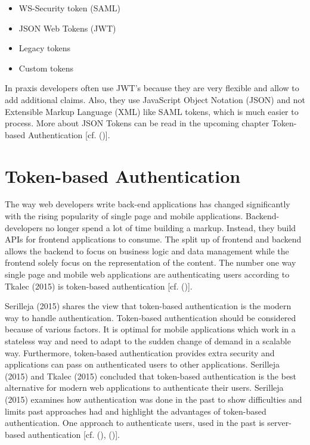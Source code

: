 \begin{itemize}
	\item WS-Security token (SAML)
	\item JSON Web Tokens (JWT)
	\item Legacy tokens
	\item Custom tokens
\end{itemize}

In praxis developers often use JWT's because they are very flexible and allow to add additional claims. Also, they use JavaScript Object Notation (JSON) and not Extensible Markup Language (XML) like SAML tokens, which is much easier to process. More about JSON Tokens can be read in the upcoming chapter Token-based Authentication [cf. (\cite{Spencer:2018:APISecurity})].

\section{Token-based Authentication}
\label{tokenBasedAuthentication}

The way web developers write back-end applications has changed significantly with the rising popularity of single page and mobile applications. Backend-developers no longer spend a lot of time building a markup. Instead, they build APIs for frontend applications to consume. The split up of frontend and backend allows the backend to focus on business logic and data management while the frontend solely focus on the representation of the content. The number one way single page and mobile web applications are authenticating users according to Tkalec (2015) is token-based authentication [cf. (\cite{Tkalec:2015})].  

Serilleja (2015) shares the view that token-based authentication is the modern way to handle authentication. Token-based authentication should be considered because of various factors. It is optimal for mobile applications which work in a stateless way and need to adapt to the sudden change of demand in a scalable way. Furthermore, token-based authentication provides extra security and applications can pass on authenticated users to other applications. Serilleja (2015) and Tkalec (2015) concluded that token-based authentication is the best alternative for modern web applications to authenticate their users. Serilleja (2015) examines how authentication was done in the past to show difficulties and limits past approaches had and highlight the advantages of token-based authentication. One approach to authenticate users, used in the past is server-based authentication [cf. (\cite{Serilleja:2015:Scothio}), (\cite{Tkalec:2015})]. 

